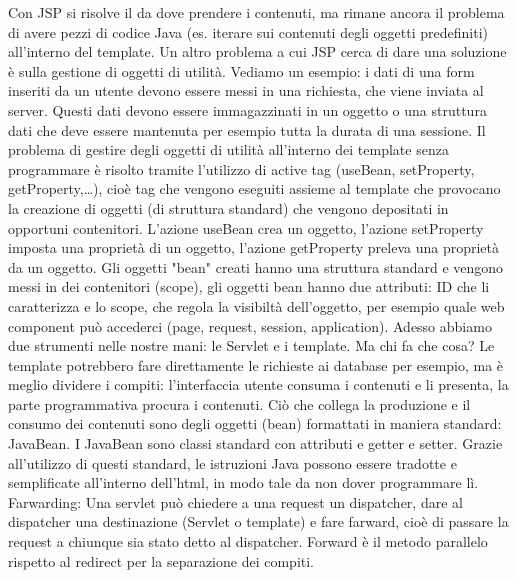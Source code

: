 Con JSP si risolve il da dove prendere i contenuti, ma rimane ancora il problema di avere pezzi di codice Java (es. iterare sui contenuti degli oggetti predefiniti) all'interno del template.\newline
\newline
Un altro problema a cui JSP cerca di dare una soluzione è sulla gestione di oggetti di utilità.\newline
Vediamo un esempio: i dati di una form inseriti da un utente devono essere messi in una richiesta, che viene inviata al server. Questi dati devono essere immagazzinati in un oggetto o una struttura dati che deve essere mantenuta per esempio tutta la durata di una sessione.\newline
Il problema di gestire degli oggetti di utilità all'interno dei template senza programmare è risolto tramite l'utilizzo di active tag (useBean, setProperty, getProperty,\dots), cioè tag che vengono eseguiti assieme al template che provocano la creazione di oggetti (di struttura standard) che vengono depositati in opportuni contenitori.\newline
\newline
L'azione useBean crea un oggetto, l'azione setProperty imposta una proprietà di un oggetto, l'azione getProperty preleva una proprietà da un oggetto. Gli oggetti "bean" creati hanno una struttura standard e vengono messi in dei contenitori (scope), gli oggetti bean hanno due attributi: ID che li caratterizza e lo scope, che regola la visibiltà dell'oggetto, per esempio quale web component può accederci (page, request, session, application).\newline
\newline
Adesso abbiamo due strumenti nelle nostre mani: le Servlet e i template. Ma chi fa che cosa? Le template potrebbero fare direttamente le richieste ai database per esempio, ma è meglio dividere i compiti: l'interfaccia utente consuma i contenuti e li presenta, la parte programmativa procura i contenuti. Ciò che collega la produzione e il consumo dei contenuti sono degli oggetti (bean) formattati in maniera standard: JavaBean.\newline
I JavaBean sono classi standard con attributi e getter e setter. Grazie all'utilizzo di questi standard, le istruzioni Java possono essere tradotte e semplificate all'interno dell'html, in modo tale da non dover programmare lì.\newline
\newline
Farwarding: Una servlet può chiedere a una request un dispatcher, dare al dispatcher una destinazione (Servlet o template) e fare farward, cioè di passare la request a chiunque sia stato detto al dispatcher. Forward è il metodo parallelo rispetto al redirect per la separazione dei compiti.\newline
